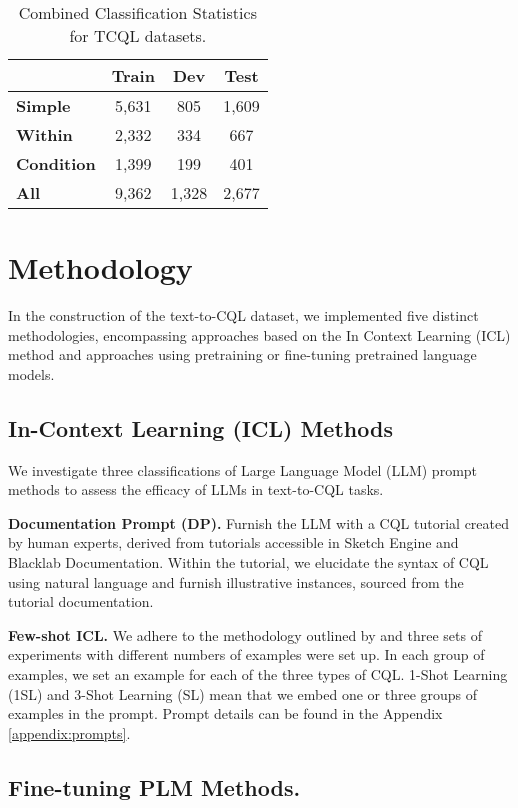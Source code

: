 \documentclass[11pt]{article}
\begin{document}
\begin{CJK*}{UTF8}{gbsn}
\begin{table}[h!]
\centering
\begin{tabular}{lccc}
\toprule
 & \textbf{Train} & \textbf{Dev} & \textbf{Test} \\
\midrule
\textbf{Simple} & 5,631 & 805 & 1,609 \\
\textbf{Within} & 2,332 & 334 & 667 \\
\textbf{Condition} & 1,399 & 199 & 401 \\
\textbf{All} & 9,362 & 1,328 & 2,677 \\
\bottomrule
\end{tabular}
\caption{Combined Classification Statistics for TCQL datasets.}
\label{tab:combined_statistics}
\end{table}

\section{Methodology}
In the construction of the text-to-CQL dataset, we implemented five distinct methodologies, encompassing approaches based on the In Context Learning (ICL) method and approaches using pretraining or fine-tuning pretrained language models.

\subsection{In-Context Learning (ICL) Methods}

We investigate three classifications of Large Language Model (LLM) prompt methods to assess the efficacy of LLMs in text-to-CQL tasks.

\textbf{Documentation Prompt (DP).} Furnish the LLM with a CQL tutorial created by human experts, derived from tutorials accessible in Sketch Engine\citep{sketchengine1,sketchengine2} and Blacklab\citep{blacklab} Documentation. Within the tutorial, we elucidate the syntax of CQL using natural language and furnish illustrative instances, sourced from the tutorial documentation.

\textbf{Few-shot ICL.} We adhere to the methodology outlined by \citet{sun2023battle} and three sets of experiments with different numbers of examples were set up. In each group of examples, we set an example for each of the three types of CQL. 1-Shot Learning (1SL) and 3-Shot Learning (SL) mean that we embed one or three groups of examples in the prompt. Prompt details can be found in the Appendix \ref{appendix:prompts}.

\subsection{Fine-tuning PLM Methods. }  


\end{CJK*}
\end{document}
